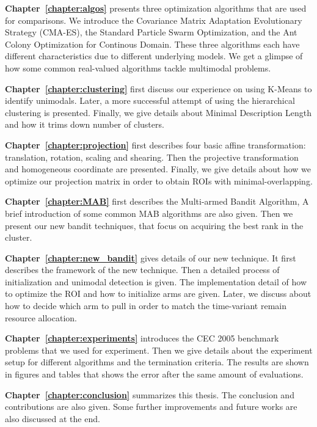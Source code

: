 \textbf{Chapter~\ref{chapter:algos}} presents three optimization algorithms that are used for comparisons.
We introduce 
the Covariance Matrix Adaptation Evolutionary Strategy (CMA-ES),
the Standard Particle Swarm Optimization, and
the Ant Colony Optimization for Continous Domain.
These three algorithms each have different characteristics due to different underlying models.
We get a glimpse of how some common real-valued algorithms tackle multimodal problems. 


\textbf{Chapter~\ref{chapter:clustering}} first discuss our experience on using K-Means to identify unimodals.
Later, a more successful attempt of using the hierarchical clustering is presented.
Finally, we give details about Minimal Description Length and how it trims down number of clusters.

\textbf{Chapter~\ref{chapter:projection}} first describes four basic affine transformation: translation, rotation, scaling and shearing.
Then the projective transformation and homogeneous coordinate are presented.
Finally, we give details about how we optimize our projection matrix in order to obtain ROIs with minimal-overlapping.


\textbf{Chapter~\ref{chapter:MAB}} first describes the Multi-armed Bandit Algorithm, 
A brief introduction of some common MAB algorithms are also given.
Then we present our new bandit techniques, that focus on acquiring the best rank in the cluster.


\textbf{Chapter~\ref{chapter:new_bandit}} gives details of our new technique.
It first describes the framework of the new technique.
Then a detailed process of initialization and unimodal detection is given.
The implementation detail of how to optimize the ROI and how to initialize arms are given.
Later, we discuss about how to decide which arm to pull in order to match the time-variant remain resource allocation.

\textbf{Chapter~\ref{chapter:experiments}} introduces the CEC 2005 benchmark problems that we used for experiment.
Then we give details about the experiment setup for different algorithms and the termination criteria.
The results are shown in figures and tables that shows the error after the same amount of evaluations.

\textbf{Chapter~\ref{chapter:conclusion}} summarizes this thesis. 
The conclusion and contributions are also given.
Some further improvements and future works are also discussed at the end.


